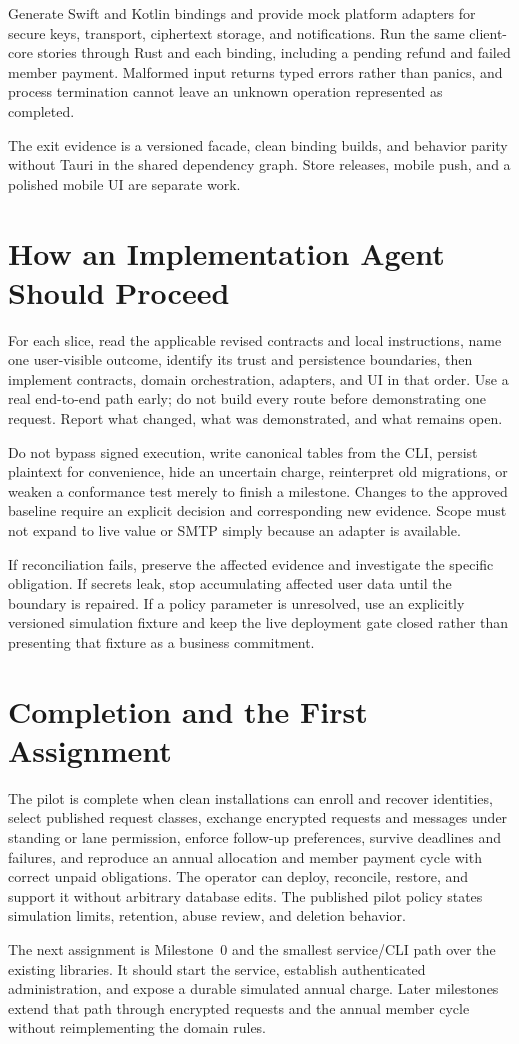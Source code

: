 \documentclass[11pt]{article}
\begin{document}
Generate Swift and Kotlin bindings and provide mock platform adapters for secure
keys, transport, ciphertext storage, and notifications. Run the same client-core
stories through Rust and each binding, including a pending refund and failed
member payment. Malformed input returns typed errors rather than panics, and
process termination cannot leave an unknown operation represented as completed.

The exit evidence is a versioned facade, clean binding builds, and behavior parity
without Tauri in the shared dependency graph. Store releases, mobile push, and a
polished mobile UI are separate work.

\section{How an Implementation Agent Should Proceed}

For each slice, read the applicable revised contracts and local instructions,
name one user-visible outcome, identify its trust and persistence boundaries,
then implement contracts, domain orchestration, adapters, and UI in that order.
Use a real end-to-end path early; do not build every route before demonstrating
one request. Report what changed, what was demonstrated, and what remains open.

Do not bypass signed execution, write canonical tables from the CLI, persist
plaintext for convenience, hide an uncertain charge, reinterpret old migrations,
or weaken a conformance test merely to finish a milestone. Changes to the approved
baseline require an explicit decision and corresponding new evidence. Scope must
not expand to live value or SMTP simply because an adapter is available.

If reconciliation fails, preserve the affected evidence and investigate the
specific obligation. If secrets leak, stop accumulating affected user data until
the boundary is repaired. If a policy parameter is unresolved, use an explicitly
versioned simulation fixture and keep the live deployment gate closed rather
than presenting that fixture as a business commitment.

\section{Completion and the First Assignment}

The pilot is complete when clean installations can enroll and recover identities,
select published request classes, exchange encrypted requests and messages under
standing or lane permission, enforce follow-up
preferences, survive deadlines and failures, and reproduce an annual allocation and member payment cycle
with correct unpaid obligations. The operator can deploy, reconcile, restore,
and support it without arbitrary database edits. The published pilot policy
states simulation limits, retention, abuse review, and deletion behavior.

The next assignment is Milestone~0 and the smallest service/CLI path over the
existing libraries. It should start the service, establish authenticated
administration, and expose a durable simulated annual charge. Later milestones
extend that path through encrypted requests and the annual member cycle without
reimplementing the domain rules.
\end{document}

